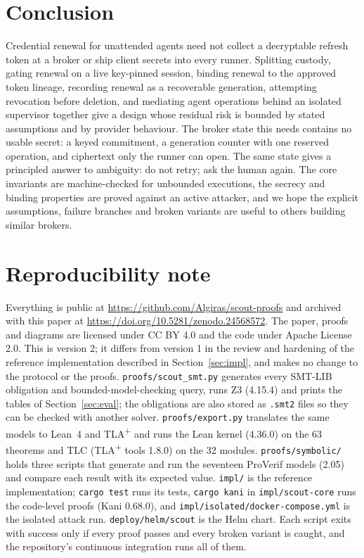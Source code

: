 \documentclass[11pt]{article}
\begin{document}
\section{Conclusion}
Credential renewal for unattended agents need not collect a decryptable refresh token at a broker or ship client secrets into every runner. Splitting custody, gating renewal on a live key-pinned session, binding renewal to the approved token lineage, recording renewal as a recoverable generation, attempting revocation before deletion, and mediating agent operations behind an isolated supervisor together give a design whose residual risk is bounded by stated assumptions and by provider behaviour. The broker state this needs contains no usable secret: a keyed commitment, a generation counter with one reserved operation, and ciphertext only the runner can open. The same state gives a principled answer to ambiguity: do not retry; ask the human again. The core invariants are machine-checked for unbounded executions, the secrecy and binding properties are proved against an active attacker, and we hope the explicit assumptions, failure branches and broken variants are useful to others building similar brokers.

\appendix
\section*{Reproducibility note}
Everything is public at \url{https://github.com/Algiras/scout-proofs} and archived with this paper at \url{https://doi.org/10.5281/zenodo.24568572}. The paper, proofs and diagrams are licensed under CC BY 4.0 and the code under Apache License 2.0. This is version 2; it differs from version 1 in the review and hardening of the reference implementation described in Section~\ref{sec:impl}, and makes no change to the protocol or the proofs. \texttt{proofs/scout\_smt.py} generates every SMT-LIB obligation and bounded-model-checking query, runs Z3 (4.15.4) and prints the tables of Section~\ref{sec:eval}; the obligations are also stored as \texttt{.smt2} files so they can be checked with another solver. \texttt{proofs/export.py} translates the same models to Lean~4 and TLA\textsuperscript{+} and runs the Lean kernel (4.36.0) on the 63 theorems and TLC (TLA\textsuperscript{+} tools 1.8.0) on the 32 modules. \texttt{proofs/symbolic/} holds three scripts that generate and run the seventeen ProVerif models (2.05) and compare each result with its expected value. \texttt{impl/} is the reference implementation; \texttt{cargo test} runs its tests, \texttt{cargo kani} in \texttt{impl/scout-core} runs the code-level proofs (Kani 0.68.0), and \texttt{impl/isolated/docker-compose.yml} is the isolated attack run. \texttt{deploy/helm/scout} is the Helm chart. Each script exits with success only if every proof passes and every broken variant is caught, and the repository's continuous integration runs all of them.
\end{document}
